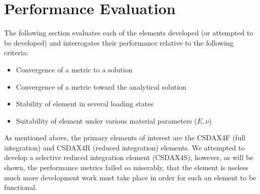 \documentclass[10pt,letterpaper]{report}
\numberwithin{equation}{chapter}
\begin{document}
%
%
%
%
%

\chapter{Performance Evaluation}
The following section evaluates each of the elements developed (or attempted to be developed) and interrogates their performance relative to the following criteria:
\begin{itemize}
\item Convergence of a metric to a solution
\item Convergence of a metric toward the analytical solution
\item Stability of element in several loading states
\item Suitability of element under various material parameters ($E,\nu$)
\end{itemize}

As mentioned above, the primary elements of interest are the CSDAX4F (full integration) and CSDAX4R (reduced integration) elements. We attempted to develop a selective reduced integration element (CSDAX4S), however, as will be shown, the performance metrics failed so miserably, that the element is useless much more development work must take place in order for such an element to be functional. 
\end{document}

